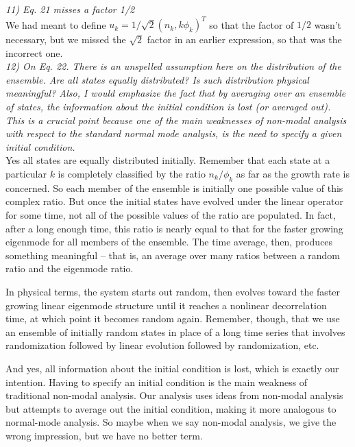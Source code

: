 \documentclass[12pt]{article}
\begin{document}
\emph{11) Eq. 21 misses a factor 1/2 }\\

We had meant to define $u_k = 1/ \sqrt{2} (n_k, k \phi_k)^T$ so that the factor of $1/2$ wasn't necessary, but we missed the $\sqrt{2}$ factor in an earlier expression, so that was the incorrect one.\\

\emph{12) On Eq. 22. There is an unspelled assumption here on the distribution of the ensemble. Are all states equally distributed? Is such distribution physical meaningful? Also, I would emphasize the fact that by averaging over an ensemble of states, the information about the initial condition is lost (or averaged out). This is a crucial point because one of the main weaknesses of non-modal analysis with respect to the standard normal mode analysis, is the need to specify a given initial condition. }\\

Yes all states are equally distributed initially. Remember that each state at a particular $k$ is completely classified by the ratio $n_k/\phi_k$ as far as the growth rate is concerned.
So each member of the ensemble is initially one possible value of this complex ratio. But once the initial states have evolved under the linear operator for some time, not all of
the possible values of the ratio are populated. In fact, after a long enough time, this ratio is nearly equal to that for the faster growing eigenmode for all members of the ensemble.
The time average, then, produces something meaningful -- that is, an average over many ratios between a random ratio and the eigenmode ratio. 

In physical terms, the system starts out random, then evolves toward the faster growing linear eigenmode structure until it reaches a nonlinear decorrelation time, at which point it becomes
random again. Remember, though, that we use an ensemble of initially random states in place of a long time series that involves randomization followed by linear evolution followed by
randomization, etc.

And yes, all information about the initial condition is lost, which is exactly our intention. Having to specify an initial condition is the main weakness of traditional non-modal analysis.
Our analysis uses ideas from non-modal analysis but attempts to average out the initial condition, making it more analogous to normal-mode analysis. So maybe when we say non-modal analysis,
we give the wrong impression, but we have no better term.\\
\end{document}
